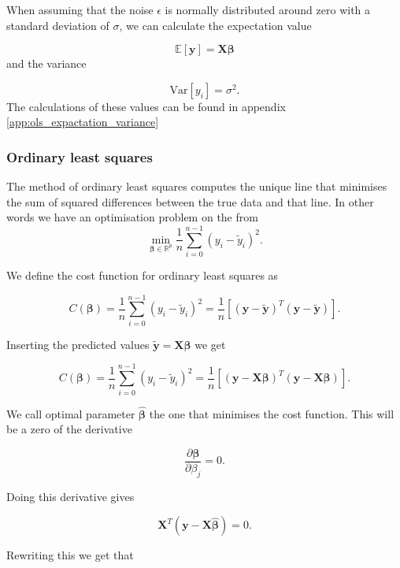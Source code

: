 When assuming that the noise $\epsilon$ is normally distributed around zero with a standard deviation of $\sigma$, we can calculate the expectation value

\begin{equation}\label{eq:expectation_y}
\mathbb{E}[\mathbf y] = \mathbf{X}\boldsymbol{\beta}
\end{equation}
and the variance

\begin{equation}\label{eq:variance_y}
\mbox{Var}[ y_i] = \sigma^2.
\end{equation}
The calculations of these values can be found in appendix \ref{app:ols_expactation_variance}

\subsubsection{Ordinary least squares}

The method of ordinary least squares computes the unique line that minimises the sum of squared differences between the true data and that line. In other words we have an optimisation problem on the from
$$
{\displaystyle \min_{\boldsymbol{\beta}\in
{\mathbb{R}}^{p}}}\frac{1}{n}\sum_{i=0}^{n-1}\left(y_i-\tilde{y}_i\right)^2.
$$

We define the cost function for ordinary least squares as

$$
C(\boldsymbol\beta) = \frac{1}{n}\sum_{i=0}^{n-1}(y_i-\tilde{y}_i)^2=\frac{1}{n}\left[(\mathbf{y}-\mathbf{\tilde y})^T(\mathbf{y}-\mathbf{\tilde y}) \right].
$$


Inserting the predicted values $\mathbf{\tilde y}=\mathbf{X}\boldsymbol\beta$ we get

$$
C(\boldsymbol\beta) = \frac{1}{n}\sum_{i=0}^{n-1}(y_i-\tilde{y}_i)^2=\frac{1}{n}\left[(\mathbf{y}-\mathbf{X}\boldsymbol\beta)^T(\mathbf{y}-\mathbf{X}\boldsymbol\beta) \right].
$$

We call optimal parameter $\hat{\boldsymbol\beta}$ the one that minimises the cost function. This will be a zero of the derivative

$$
\frac{\partial \boldsymbol\beta}{\partial \beta_j} = 0.
$$

Doing this derivative gives

$$
\mathbf{X}^T (\mathbf{y}-\mathbf{X}\hat{\boldsymbol{\beta}} )=0.
$$

Rewriting this we get that

